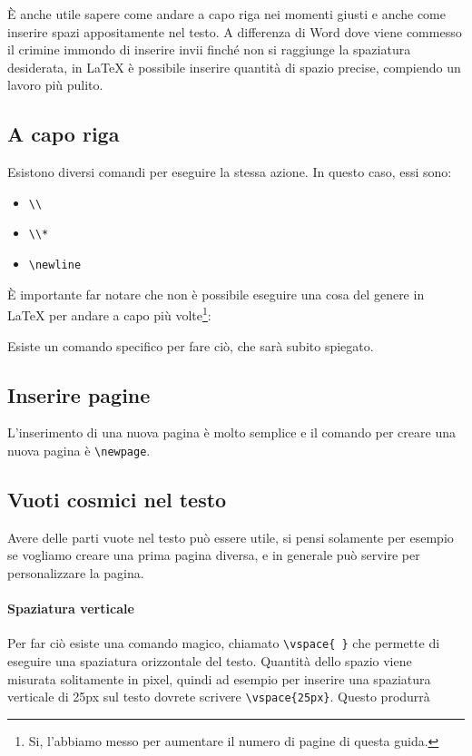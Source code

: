 È anche utile sapere come andare a capo riga nei momenti giusti e anche come 
inserire spazi appositamente nel testo. A differenza di Word dove viene 
commesso il crimine immondo di inserire invii finché non si raggiunge la 
spaziatura desiderata, in \LaTeX{} è possibile inserire quantità di spazio 
precise, compiendo un lavoro più pulito.

\subsection{A capo riga}

Esistono diversi comandi per eseguire la stessa azione. In questo caso, essi 
sono:
\begin{itemize}
 \item \verb!\\!
 \item \verb!\\*!
 \item \verb!\newline!
\end{itemize}

È importante far notare che non è possibile eseguire una cosa del genere in 
\LaTeX{} per andare a capo più volte\footnote{Si, l'abbiamo messo per 
aumentare il numero di pagine di questa guida.}:



Esiste un comando specifico per fare ciò, che sarà subito spiegato.

\subsection{Inserire pagine}

L'inserimento di una nuova pagina è molto semplice e il comando per creare una 
nuova pagina è \verb!\newpage!.

\subsection{Vuoti cosmici nel testo}

Avere delle parti vuote nel testo può essere utile, si pensi solamente per 
esempio se vogliamo creare una prima pagina diversa, e in generale può servire 
per personalizzare la pagina.

\paragraph*{Spaziatura verticale} Per far ciò esiste una comando magico, 
chiamato \verb!\vspace{ }! che permette di eseguire una spaziatura orizzontale 
del testo. Quantità dello spazio viene misurata solitamente in pixel, quindi ad 
esempio per inserire una spaziatura verticale di 25px sul testo dovrete 
scrivere \verb!\vspace{25px}!. Questo produrrà

